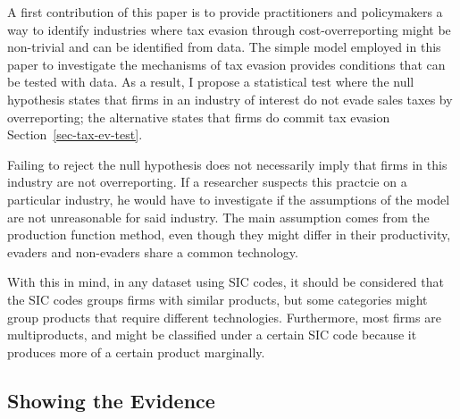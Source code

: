 \documentclass[
  12pt]{article}
\theoremstyle{definition}
\theoremstyle{remark}
\begin{document}
A first contribution of this paper is to provide practitioners and
policymakers a way to identify industries where tax evasion through
cost-overreporting might be non-trivial and can be identified from data.
The simple model employed in this paper to investigate the mechanisms of
tax evasion provides conditions that can be tested with data. As a
result, I propose a statistical test where the null hypothesis states
that firms in an industry of interest do not evade sales taxes by
overreporting; the alternative states that firms do commit tax evasion
Section~\ref{sec-tax-ev-test}.

Failing to reject the null hypothesis does not necessarily imply that
firms in this industry are not overreporting. If a researcher suspects
this practcie on a particular industry, he would have to investigate if
the assumptions of the model are not unreasonable for said industry. The
main assumption comes from the production function method, even though
they might differ in their productivity, evaders and non-evaders share a
common technology.

With this in mind, in any dataset using SIC codes, it should be
considered that the SIC codes groups firms with similar products, but
some categories might group products that require different
technologies. Furthermore, most firms are multiproducts, and might be
classified under a certain SIC code because it produces more of a
certain product marginally.

\subsection{Showing the Evidence}\label{showing-the-evidence}
\end{document}

